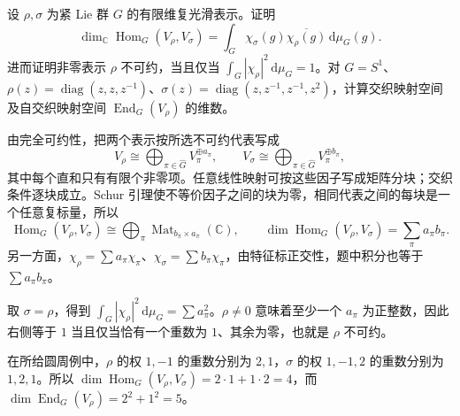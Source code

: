 \begin{exercise}\label{g1:ex:intertwiner-character-dimension}
	设 \(\rho,\sigma\) 为紧 Lie 群 \(G\) 的有限维复光滑表示。证明
	\[
		\dim_{\mathbb C}\operatorname{Hom}_G(V_\rho,V_\sigma)
		=\int_G\chi_\sigma(g)\overline{\chi_\rho(g)}\,\mathrm{d}\mu_G(g).
	\]
	进而证明非零表示 \(\rho\) 不可约，当且仅当 \(\int_G|\chi_\rho|^2\,\mathrm{d}\mu_G=1\)。对 \(G=S^1\)、\(\rho(z)=\operatorname{diag}(z,z,z^{-1})\)、\(\sigma(z)=\operatorname{diag}(z,z^{-1},z^{-1},z^2)\)，计算交织映射空间及自交织映射空间 \(\operatorname{End}_G(V_\rho)\) 的维数。
\end{exercise}
\begin{solution}
	由完全可约性，把两个表示按所选不可约代表写成
	\[
		V_\rho\cong\bigoplus_{\pi\in\widehat G}V_\pi^{\oplus a_\pi},
		\qquad
		V_\sigma\cong\bigoplus_{\pi\in\widehat G}V_\pi^{\oplus b_\pi},
	\]
	其中每个直和只有有限个非零项。任意线性映射可按这些因子写成矩阵分块；交织条件逐块成立。Schur 引理使不等价因子之间的块为零，相同代表之间的每块是一个任意复标量，所以
	\[
		\operatorname{Hom}_G(V_\rho,V_\sigma)
		\cong\bigoplus_\pi\operatorname{Mat}_{b_\pi\times a_\pi}(\mathbb C),
		\qquad \dim\operatorname{Hom}_G(V_\rho,V_\sigma)=\sum_\pi a_\pi b_\pi.
	\]
	另一方面，\(\chi_\rho=\sum a_\pi\chi_\pi\)、\(\chi_\sigma=\sum b_\pi\chi_\pi\)，由特征标正交性，题中积分也等于 \(\sum a_\pi b_\pi\)。

	取 \(\sigma=\rho\)，得到 \(\int_G|\chi_\rho|^2\,\mathrm{d}\mu_G=\sum a_\pi^2\)。\(\rho\ne0\) 意味着至少一个 \(a_\pi\) 为正整数，因此右侧等于 \(1\) 当且仅当恰有一个重数为 \(1\)、其余为零，也就是 \(\rho\) 不可约。

	在所给圆周例中，\(\rho\) 的权 \(1,-1\) 的重数分别为 \(2,1\)，\(\sigma\) 的权 \(1,-1,2\) 的重数分别为 \(1,2,1\)。所以 \(\dim\operatorname{Hom}_G(V_\rho,V_\sigma)=2\cdot1+1\cdot2=4\)，而 \(\dim\operatorname{End}_G(V_\rho)=2^2+1^2=5\)。
\end{solution}

